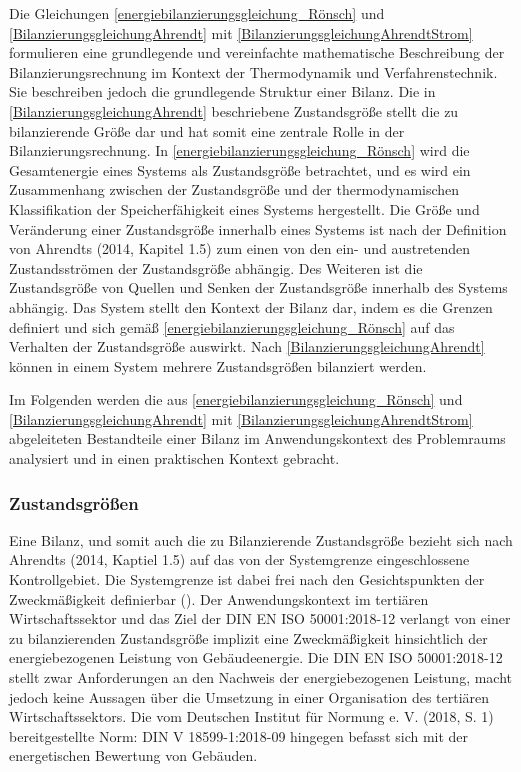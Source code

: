 Die Gleichungen \eqref{energiebilanzierungsgleichung_Rönsch} und \eqref{BilanzierungsgleichungAhrendt} mit \eqref{BilanzierungsgleichungAhrendtStrom} 
formulieren eine grundlegende und vereinfachte mathematische Beschreibung der Bilanzierungsrechnung im Kontext der Thermodynamik und Verfahrenstechnik. 
Sie beschreiben jedoch die grundlegende Struktur einer Bilanz. 
Die in \eqref{BilanzierungsgleichungAhrendt} beschriebene Zustandsgröße stellt die zu bilanzierende Größe dar und hat somit eine zentrale Rolle in der 
Bilanzierungsrechnung. In \eqref{energiebilanzierungsgleichung_Rönsch} wird die Gesamtenergie eines Systems als Zustandsgröße betrachtet, 
und es wird ein Zusammenhang zwischen der Zustandsgröße und der thermodynamischen Klassifikation der Speicherfähigkeit eines Systems hergestellt.
Die Größe und Veränderung einer Zustandsgröße innerhalb eines Systems ist nach der Definition von Ahrendts (2014, Kapitel 1.5) zum einen  
von den ein- und austretenden Zustandsströmen der Zustandsgröße abhängig. 
Des Weiteren ist die Zustandsgröße von Quellen und Senken der Zustandsgröße innerhalb des Systems abhängig.
Das System stellt den Kontext der Bilanz dar, indem es die Grenzen definiert und sich gemäß \eqref{energiebilanzierungsgleichung_Rönsch} auf das Verhalten der 
Zustandsgröße auswirkt. Nach \eqref{BilanzierungsgleichungAhrendt} können in einem System mehrere Zustandsgrößen bilanziert werden.

Im Folgenden werden die aus \eqref{energiebilanzierungsgleichung_Rönsch} und \eqref{BilanzierungsgleichungAhrendt} mit \eqref{BilanzierungsgleichungAhrendtStrom} 
abgeleiteten Bestandteile einer Bilanz im Anwendungskontext des Problemraums analysiert und in einen praktischen Kontext gebracht. 

\subsubsection{Zustandsgrößen}
Eine Bilanz, und somit auch die zu Bilanzierende Zustandsgröße bezieht sich nach Ahrendts (2014, Kaptiel 1.5) auf das von der Systemgrenze eingeschlossene Kontrollgebiet. 
Die Systemgrenze ist dabei frei nach den Gesichtspunkten der Zweckmäßigkeit definierbar (\cite[Kapitel 1.5]{Ahrendts.2014}).
Der Anwendungskontext im tertiären Wirtschaftssektor und das Ziel der DIN EN ISO 50001:2018-12 verlangt von einer zu bilanzierenden Zustandsgröße implizit eine 
Zweckmäßigkeit hinsichtlich der energiebezogenen Leistung von Gebäudeenergie. Die DIN EN ISO 50001:2018-12 stellt zwar Anforderungen an den Nachweis der energiebezogenen 
Leistung, macht jedoch keine Aussagen über die Umsetzung in einer Organisation des tertiären Wirtschaftssektors.
Die vom Deutschen Institut für Normung e. V. (2018, S. 1) bereitgestellte Norm: DIN V 18599-1:2018-09 hingegen befasst sich mit der energetischen Bewertung von 
Gebäuden. 

